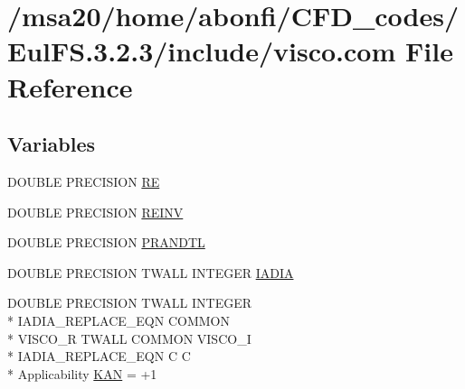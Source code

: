 \hypertarget{msa20_2home_2abonfi_2_c_f_d__codes_2_eul_f_s_83_82_83_2include_2visco_8com}{\section{/msa20/home/abonfi/\-C\-F\-D\-\_\-codes/\-Eul\-F\-S.3.2.3/include/visco.com File Reference}
\label{msa20_2home_2abonfi_2_c_f_d__codes_2_eul_f_s_83_82_83_2include_2visco_8com}
}
\subsection*{Variables}
\begin{DoxyCompactItemize}
\item 
D\-O\-U\-B\-L\-E P\-R\-E\-C\-I\-S\-I\-O\-N \hyperlink{msa20_2home_2abonfi_2_c_f_d__codes_2_eul_f_s_83_82_83_2include_2visco_8com_acee3bf3b2f2eee0ca24fa7fcea80bf5e}{R\-E}
\item 
D\-O\-U\-B\-L\-E P\-R\-E\-C\-I\-S\-I\-O\-N \hyperlink{msa20_2home_2abonfi_2_c_f_d__codes_2_eul_f_s_83_82_83_2include_2visco_8com_a572d2eabf094e0bf11921a66d45a36b2}{R\-E\-I\-N\-V}
\item 
D\-O\-U\-B\-L\-E P\-R\-E\-C\-I\-S\-I\-O\-N \hyperlink{msa20_2home_2abonfi_2_c_f_d__codes_2_eul_f_s_83_82_83_2include_2visco_8com_a230c5bd89486988c1c250f8d67ed6266}{P\-R\-A\-N\-D\-T\-L}
\item 
D\-O\-U\-B\-L\-E P\-R\-E\-C\-I\-S\-I\-O\-N T\-W\-A\-L\-L I\-N\-T\-E\-G\-E\-R \hyperlink{msa20_2home_2abonfi_2_c_f_d__codes_2_eul_f_s_83_82_83_2include_2visco_8com_aac6f06569f9c01d0b51c03f107eb2693}{I\-A\-D\-I\-A}
\item 
D\-O\-U\-B\-L\-E P\-R\-E\-C\-I\-S\-I\-O\-N T\-W\-A\-L\-L I\-N\-T\-E\-G\-E\-R \\*
I\-A\-D\-I\-A\-\_\-\-R\-E\-P\-L\-A\-C\-E\-\_\-\-E\-Q\-N C\-O\-M\-M\-O\-N \\*
V\-I\-S\-C\-O\-\_\-\-R T\-W\-A\-L\-L C\-O\-M\-M\-O\-N V\-I\-S\-C\-O\-\_\-\-I \\*
I\-A\-D\-I\-A\-\_\-\-R\-E\-P\-L\-A\-C\-E\-\_\-\-E\-Q\-N C C \\*
Applicability \hyperlink{msa20_2home_2abonfi_2_c_f_d__codes_2_eul_f_s_83_82_83_2include_2visco_8com_a5f14ddc0c5ad4e7f0d7ed332eeafbbcb}{K\-A\-N} = +1
\end{DoxyCompactItemize}


